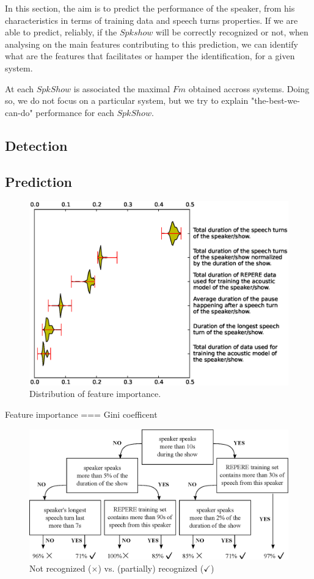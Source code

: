 In this section, the aim is to predict the performance of the speaker, from his characteristics in terms of training data and speech turns properties. If we are able to predict, reliably, if the $Spkshow$ will be correctly recognized or not, when analysing on the main features contributing to this prediction, we can identify what are the features that  facilitates or hamper the identification, for a given system.

At each $SpkShow$ is associated the maximal $Fm$ obtained accross systems. Doing so, we do not focus on a particular system, but we try to explain "the-best-we-can-do" performance for each $SpkShow$.

\subsection{Detection}


\subsection{Prediction}


\begin{figure}[t]
\centering
\includegraphics[width=\linewidth]{figures/violin.eps}
\caption{Distribution of feature importance.}
\label{fig:featureImportance}
\end{figure}


Feature importance === Gini coefficent~\cite{Breiman2001}


\begin{figure}[t]
\centering
\includegraphics[width=0.7\linewidth]{figures/tree.eps}
\caption{Not recognized ($\times$) vs. (partially) recognized ($\checkmark$)}
\label{fig:tree}
\end{figure}
